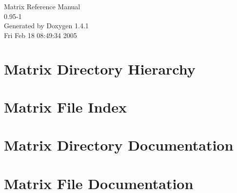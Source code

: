 \documentclass[letterpaper]{article}
\begin{document}
\begin{titlepage}
\vspace*{7cm}
\begin{center}
{\Large Matrix Reference Manual\\[1ex]\large 0.95-1 }\\
\vspace*{1cm}
{\large Generated by Doxygen 1.4.1}\\
\vspace*{0.5cm}
{\small Fri Feb 18 08:49:34 2005}\\
\end{center}
\end{titlepage}
\tableofcontents
{}
\section{Matrix Directory Hierarchy}

\section{Matrix File Index}

\section{Matrix Directory Documentation}

\section{Matrix File Documentation}





















































\printindex
\end{document}
